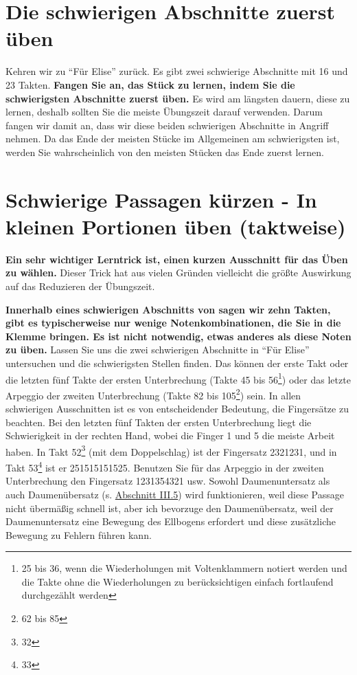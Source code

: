 
\hypertarget{c1ii5}{}


\section{Die schwierigen Abschnitte zuerst üben}

Kehren wir zu \enquote{Für Elise} zurück.
Es gibt zwei schwierige Abschnitte mit 16 und 23 Takten.
\textbf{Fangen Sie an, das Stück zu lernen, indem Sie die schwierigsten Abschnitte zuerst üben.}
Es wird am längsten dauern, diese zu lernen, deshalb sollten Sie die meiste Übungszeit darauf verwenden.
Darum fangen wir damit an, dass wir diese beiden schwierigen Abschnitte in Angriff nehmen.
Da das Ende der meisten Stücke im Allgemeinen am schwierigsten ist, werden Sie wahrscheinlich von den meisten Stücken das Ende zuerst lernen.
 

\section{Schwierige Passagen kürzen - In kleinen Portionen üben (taktweise)}\hypertarget{c1ii6}{}

\textbf{Ein sehr wichtiger Lerntrick ist, einen kurzen Ausschnitt für das Üben zu wählen.}
Dieser Trick hat aus vielen Gründen vielleicht die größte Auswirkung auf das Reduzieren der Übungszeit.

\textbf{Innerhalb eines schwierigen Abschnitts von sagen wir zehn Takten, gibt es typischerweise nur wenige Notenkombinationen, die Sie in die Klemme bringen.
Es ist nicht notwendig, etwas anderes als diese Noten zu üben.}
Lassen Sie uns die zwei schwierigen Abschnitte in \enquote{Für Elise} untersuchen und die schwierigsten Stellen finden.
Das können der erste Takt oder die letzten fünf Takte der ersten Unterbrechung (Takte 45 bis 56\footnote{25 bis 36, wenn die Wiederholungen mit Voltenklammern notiert werden und die Takte ohne die Wiederholungen zu berücksichtigen einfach fortlaufend durchgezählt werden}) oder das letzte Arpeggio der zweiten Unterbrechung (Takte 82 bis 105\footnote{62 bis 85}) sein.
In allen schwierigen Ausschnitten ist es von entscheidender Bedeutung, die Fingersätze zu beachten.
Bei den letzten fünf Takten der ersten Unterbrechung liegt die Schwierigkeit in der rechten Hand, wobei die Finger 1 und 5 die meiste Arbeit haben.
In Takt 52\footnote{32} (mit dem Doppelschlag) ist der Fingersatz 2321231, und in Takt 53\footnote{33} ist er 251515151525.
Benutzen Sie für das Arpeggio in der zweiten Unterbrechung den Fingersatz 1231354321 usw.
Sowohl Daumenuntersatz als auch Daumenübersatz (s. \hyperlink{c1iii5}{Abschnitt III.5}) wird funktionieren, weil diese Passage nicht übermäßig schnell ist, aber ich bevorzuge den Daumenübersatz, weil der Daumenuntersatz eine Bewegung des Ellbogens erfordert und diese zusätzliche Bewegung zu Fehlern führen kann.

